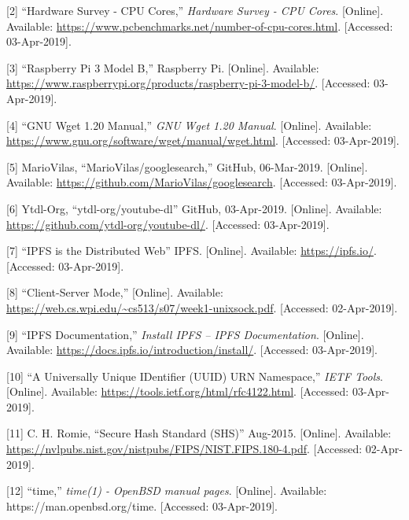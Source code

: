 \documentclass{article}
\begin{document}
[2] ``Hardware Survey - CPU Cores,'' \textit{Hardware Survey - CPU Cores}. [Online]. Available: \url{https://www.pcbenchmarks.net/number-of-cpu-cores.html}. [Accessed: 03-Apr-2019]. 

[3] ``Raspberry Pi 3 Model B,'' Raspberry Pi. [Online]. Available:
\url{https://www.raspberrypi.org/products/raspberry-pi-3-model-b/}. [Accessed:
03-Apr-2019].

[4] ``GNU Wget 1.20 Manual,'' \textit{GNU Wget 1.20
  Manual}. [Online]. Available:
\url{https://www.gnu.org/software/wget/manual/wget.html}. [Accessed:
03-Apr-2019].

[5] MarioVilas, ``MarioVilas/googlesearch,'' GitHub,
06-Mar-2019. [Online]. Available:
\url{https://github.com/MarioVilas/googlesearch}. [Accessed:
03-Apr-2019].

[6] Ytdl-Org, ``ytdl-org/youtube-dl'' GitHub,
03-Apr-2019. [Online]. Available:
\url{https://github.com/ytdl-org/youtube-dl/}. [Accessed:
03-Apr-2019].

[7] ``IPFS is the Distributed Web'' IPFS. [Online]. Available:
\url{https://ipfs.io/}. [Accessed: 03-Apr-2019].

[8] ``Client-Server Mode,'' [Online]. Available:
\url{https://web.cs.wpi.edu/~cs513/s07/week1-unixsock.pdf}. [Accessed:
02-Apr-2019].

[9] ``IPFS Documentation,'' \textit{Install IPFS – IPFS Documentation}. [Online]. Available: \url{https://docs.ipfs.io/introduction/install/}. [Accessed: 03-Apr-2019]. 

[10] ``A Universally Unique IDentifier (UUID) URN Namespace,''
\textit{IETF Tools}. [Online]. Available:
\url{https://tools.ietf.org/html/rfc4122.html}. [Accessed:
03-Apr-2019].

[11] C. H. Romie, ``Secure Hash Standard (SHS)'' Aug-2015. [Online]. Available: \url{https://nvlpubs.nist.gov/nistpubs/FIPS/NIST.FIPS.180-4.pdf}. [Accessed: 02-Apr-2019].

[12] ``time,'' \textit{time(1) - OpenBSD manual pages}. [Online]. Available: https://man.openbsd.org/time. [Accessed: 03-Apr-2019].
\end{document}

